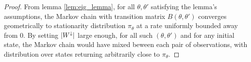   \begin{proof}
%
{From lemma \ref{lem:eig_lemma}, for all $\theta, \theta'$ satisfying 
 the lemma's assumptions, 
 the Markov chain with transition matrix $B(\theta, \theta')$ converges 
 geometrically to stationarity distribution $\pi_\theta$  
 at a rate uniformly bounded away from 0.
}
By setting ${|W^\downarrow}|$ large enough, for all such $(\theta,\theta')$ and for 
any initial state, the Markov chain would have mixed beween each pair of
observations, with distribution over states returning arbitrarily 
close to $\pi_\theta$.





\end{proof}
